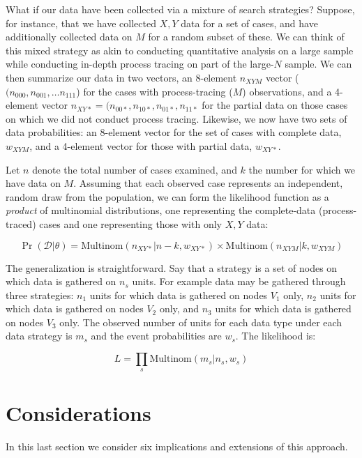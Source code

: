 \documentclass[
  12pt,
]{book}
\begin{document}
What if our data have been collected via a mixture of search strategies? Suppose, for instance, that we have collected \(X,Y\) data for a set of cases, and have additionally collected data on \(M\) for a random subset of these. We can think of this mixed strategy as akin to conducting quantitative analysis on a large sample while conducting in-depth process tracing on part of the large-\(N\) sample. We can then summarize our data in two vectors, an 8-element \(n_{XYM}\) vector (\((n_{000},n_{001},\dots n_{111}\)) for the cases with process-tracing (\(M\)) observations, and a 4-element vector \(n_{XY*} = (n_{00*},n_{10*},n_{01*},n_{11*}\) for the partial data on those cases on which we did not conduct process tracing. Likewise, we now have two sets of data probabilities: an 8-element vector for the set of cases with complete data, \(w_{XYM}\), and a 4-element vector for those with partial data, \(w_{XY*}\).

Let \(n\) denote the total number of cases examined, and \(k\) the number for which we have data on \(M\). Assuming that each observed case represents an independent, random draw from the population, we can form the likelihood function as a \emph{product} of multinomial distributions, one representing the complete-data (process-traced) cases and one representing those with only \(X,Y\) data:

\[\Pr(\mathcal{D}|\theta) = 
  \text{Multinom}\left(n_{XY*}|n-k, w_{XY*}\right) \times \text{Multinom}\left(n_{XYM}|k, w_{XYM}\right)\]

The generalization is straightforward. Say that a strategy is a set of nodes on which data is gathered on \(n_s\) units. For example data may be gathered through three strategies: \(n_1\) units for which data is gathered on nodes \(V_1\) only, \(n_2\) units for which data is gathered on nodes \(V_2\) only, and \(n_3\) units for which data is gathered on nodes \(V_3\) only. The observed number of units for each data type under each data strategy is \(m_s\) and the event probabilities are \(w_s\). The likelihood is:

\[L = \prod_s \text{Multinom}(m_s|n_s, w_s)\]

\hypertarget{considerations}{%
\section{Considerations}\label{considerations}}

In this last section we consider six implications and extensions of this approach.
\end{document}
